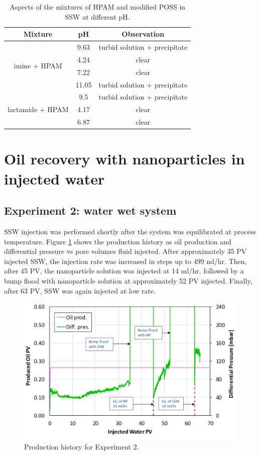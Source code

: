 \begin{table} 
\centering
\caption{Aspects of the mixtures of HPAM and modified POSS in SSW at different pH.}
\label{tab:phHPAMPOSS}
\begin{tabular}{c| c| c} 
\toprule
\textbf{Mixture} & \textbf{pH} & \textbf{Observation} \\ 
\midrule 
\multirow{4}{7em}{imine + HPAM}  & 9.63 & turbid solution + precipitate\\
& 4.24 & clear\\
& 7.22 & clear\\
& 11.05 & turbid solution + precipitate\\
\midrule
\multirow{3}{9em}{lactamide + HPAM}  & 9.5 & turbid solution + precipitate\\
& 4.17 & clear\\
& 6.87 & clear\\
\bottomrule
\end{tabular}
\end{table}


\section{Oil recovery with nanoparticles in injected water}

\subsection{Experiment 2: water wet system}
SSW injection was performed shortly after the system was equilibrated at process temperature. Figure \ref{cht:prodexp2} shows the production history as oil production and differential pressure vs pore volumes fluid injected. After approximately 35 PV injected SSW, the injection rate was increased in steps up to 499 ml/hr. Then, after 45 PV, the nanoparticle solution was injected at 14 ml/hr, followed by a bump flood with nanoparticle solution at approximately 52 PV injected. Finally, after 63 PV, SSW was again injected at low rate.

\begin{figure}[h!]
    \centering
    \includegraphics[width=\textwidth]{img/cht/prodexp2.png}
    \caption{Production history for Experiment 2.}
    \label{cht:prodexp2} %
\end{figure}

